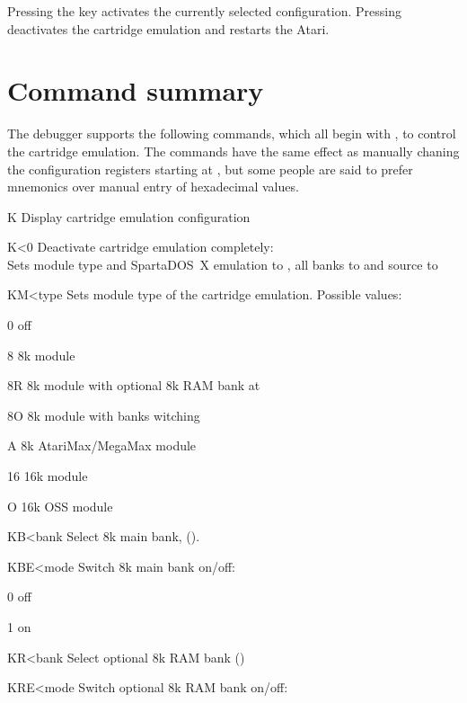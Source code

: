 Pressing the  key activates the currently selected
configuration. Pressing  deactivates the cartridge emulation and
restarts the Atari.

\section{Command summary}
The debugger supports the following commands, which all begin with , to
control the cartridge emulation. The commands have the same effect as
manually
chaning the configuration registers starting at , but some
people are said to prefer mnemonics over manual entry of hexadecimal values.

\clearpage

\begin{fcmdlist}
\item[K]
Display cartridge emulation configuration
\item[K{\textless}0]
Deactivate cartridge emulation completely: \\
Sets module type and SpartaDOS~X emulation to , all banks to 
and source to 
\item[KM{\textless}type]
Sets module type of the cartridge emulation. Possible values:
\begin{fvallistn}
\item[0] off
\item[8] 8k module
\item[8R] 8k module with optional 8k RAM bank at 
\item[8O] 8k module with  banks witching
\item[A] 8k AtariMax/MegaMax module
\item[16] 16k module
\item[O] 16k OSS module 
\end{fvallistn}
\item[KB{\textless}bank]
Select 8k main bank, ().
\item[KBE{\textless}mode]
Switch 8k main bank on/off:
\begin{fvallistn}
\item[0] off
\item[1] on
\end{fvallistn}
\item[KR{\textless}bank]
Select optional 8k RAM bank ()
\item[KRE{\textless}mode]
Switch optional 8k RAM bank on/off:
\begin{fvallistn}

\end{fvallistn}
\end{fcmdlist}

